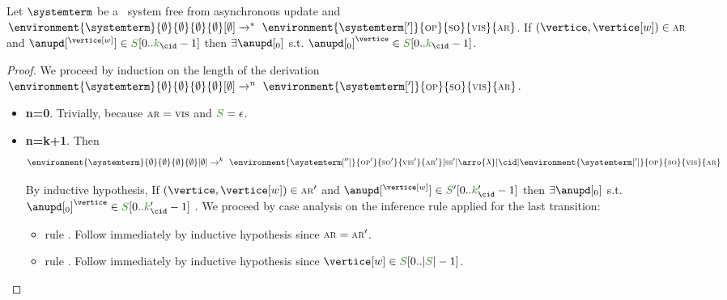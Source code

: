\begin{lemma}\label{lemma:vertice_arb_store} 

Let $\systemterm$ be a \gsp\ system free from asynchronous update and%
\linebreak $\environment{\systemterm}{\emptyset}{\emptyset}{\emptyset}{\emptyset}[\emptyset] \tr{} ^*\ \environment{\systemterm[']}{\op}{\so}{\vis}{\arb}$.
If $(\vertice,\vertice[w])\in\arb$ and $\anupd[^{\vertice[w]}] \in \queuemessage[0 .. \tknown_{\cid} - 1]$ then $\exists \anupd[_0]$ s.t. $\anupd[_0]^{\vertice} \in \queuemessage[0 .. \tknown_{\cid}-1]$.
\end{lemma}
\begin{proof}
We proceed by induction on the length of the derivation 
$\environment{\systemterm}{\emptyset}{\emptyset}{\emptyset}{\emptyset}[\emptyset] \tr{} ^n\ \environment{\systemterm[']}{\op}{\so}{\vis}{\arb}$.

\begin{itemize}
	    \item {\bf n=0}. Trivially, because $\textsc{\scriptsize{AR}}=\textsc{\scriptsize{VIS}}$ and $\queuemessage=\epsilon$.
    \item{\bf n=k+1}. Then 
      \[\environment{\systemterm}{\emptyset}{\emptyset}{\emptyset}{\emptyset}[\emptyset] 
         \tr{} ^k\ 
         \environment{\systemterm['']}{\op'}{\so'}{\vis'}{\arb'}[\sse'] 
         \arro{\lambda}[\cid]
 	\environment{\systemterm[']}{\op}{\so}{\vis}{\arb}
	 \]
	 
	By inductive hypothesis, If $(\vertice,\vertice[w])\in\arb'$ and $\anupd[^{\vertice[w]}] \in \queuemessage'[0 .. \tknown_{\cid}' - 1]$ then $\exists \anupd[_0]$ s.t. $ \anupd[_0]^{\vertice} \in \queuemessage[0 .. \tknown_{\cid}'-1]$
. We proceed by 
case analysis on the inference rule applied for the last transition:

	\begin{itemize}
      
        \item rule . Follow immediately by inductive hypothesis since $\textsc{\scriptsize{AR}} = \textsc{\scriptsize{AR}}'$.      
       
        \item rule . Follow immediately by inductive hypothesis since $\vertice[w] \in \queuemessage[0 .. |\queuemessage| - 1]$.     
        

\end{itemize}
\end{itemize}
\end{proof}
